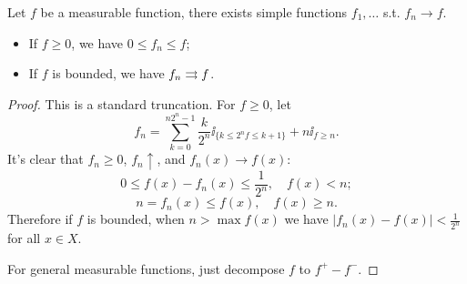 \begin{theorem}
    Let $f$ be a measurable function, there exists simple functions
	$f_1,\dots$ s.t. $f_n \to f$.
	\begin{itemize}
		\item If $f\ge 0$, we have  $0\le f_n\le f$;
		\item If  $f$ is bounded, we have  $f_n\rightrightarrows f$.
	\end{itemize}
\end{theorem}
\begin{proof}[Proof]
    This is a standard truncation.
	For $f\ge 0$, let
	\[
	f_n = \sum_{k=0}^{n 2^n -1}\frac{k}{2^n} \ii_{\{k\le 2^nf\le k+1\}} + n\ii_{f\ge n}.
	\]
	It's clear that $f_n \ge 0$,  $f_n \uparrow$, and  $f_n(x)\to f(x)$:
	 \[
	0 \le f(x) - f_n(x)\le \frac{1}{2^n},\quad f(x)<n;
	\]
	\[
	n = f_n(x) \le f(x), \quad f(x)\ge n.
	\]
	Therefore if $f$ is bounded, when  $n> \max f(x)$ we have
	$|f_n(x)-f(x)|<\frac{1}{2^n}$ for all $x\in X$.

	For general measurable functions, just decompose $f$ to $f^+ - f^-$.
\end{proof}


